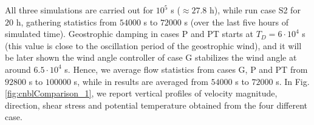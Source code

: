 \documentclass[journal abbreviation, manuscript]{copernicus}
\begin{document}
All three simulations are carried out for $10^5$ s ($\approx27.8$ h), while \cite{2017a_AllaertsMeyers} run case S2 for $20$ h, gathering statistics from $54000$ s to $72000$ s (over the last five hours of simulated time). Geostrophic damping in cases P and PT starts at $T_D=6\cdot 10^4$ s (this value is close to the oscillation period of the geostrophic wind), and it will be later shown the wind angle controller of case G stabilizes the wind angle at around $6.5\cdot 10^4$ s. Hence, we average flow statistics from cases G, P and PT from $92800$ s to $100000$ s, while in \cite{2017a_AllaertsMeyers} results are averaged from $54000$ s to $72000$ s. In Fig. \ref{fig:cnblComparison_1}, we report vertical profiles of velocity magnitude, direction, shear stress and potential temperature obtained from the four different case.
\end{document}
